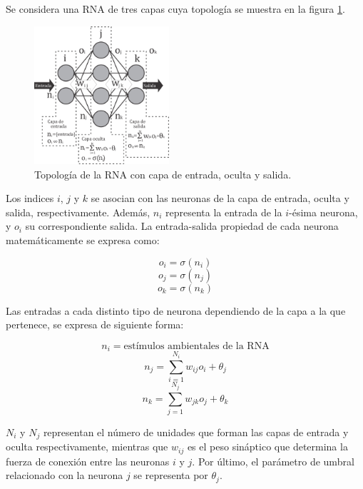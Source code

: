 Se considera una RNA de tres capas cuya topolog\'ia se
muestra en la figura \ref{fig:percep}.  

\begin{figure}[H]
	\centering
	\includegraphics[width=5cm]{img/fig_perceptron.png}
	\caption{Topolog\'ia de la RNA con capa de entrada, oculta y salida.}
	\label{fig:percep}
\end{figure}

Los indices $i$, $j$ y $k$ se asocian con las neuronas de la capa
de entrada, oculta y salida, respectivamente. Adem\'as, $n_i$ representa
la entrada de la $i$-\'esima neurona, y $o_i$ su correspondiente
salida. La entrada-salida propiedad de cada neurona
matem\'aticamente se expresa como: 

\begin{equation}
	o_i=\sigma(n_i)
	\label{input}
\end{equation}
\begin{equation}
	o_j=\sigma(n_j)
	\label{hidden}
\end{equation}
\begin{equation}
	o_k=\sigma(n_k)
	\label{output}
\end{equation}

Las entradas a cada distinto tipo de neurona dependiendo
de la capa a la que pertenece, se expresa de siguiente forma:

\begin{equation}
	n_i=\text{est\'imulos ambientales de la RNA} \label{stimulus}
\end{equation}
\begin{equation}
	n_j=\sum^{N_i}_{i=1}w_{ij}o_i+\theta_j
\end{equation}
\begin{equation}
	n_k=\sum^{N_j}_{j=1}w_{jk}o_j+\theta_k
\end{equation}

$N_i$ y $N_j$ representan el n\'umero de unidades que forman
las capas de entrada y oculta respectivamente, mientras que
$w_{ij}$ es el peso sin\'aptico que determina la fuerza de conexi\'on
entre las neuronas $i$ y $j$. Por \'ultimo, el par\'ametro de umbral
relacionado con la neurona $j$ se representa por $\theta_j$.


